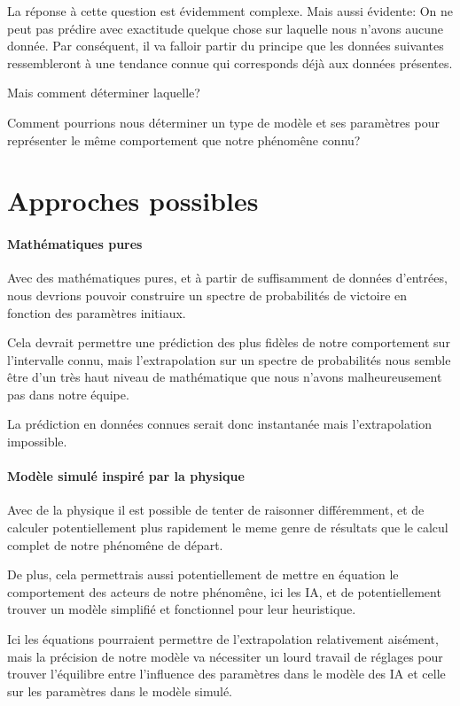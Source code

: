 		La réponse à cette question est évidemment complexe. Mais aussi évidente: On ne peut pas prédire avec exactitude quelque chose sur laquelle nous n'avons aucune donnée. 
		Par conséquent, il va falloir partir du principe que les données suivantes ressembleront à une tendance connue qui corresponds déjà aux données présentes.
		
		Mais comment déterminer laquelle?
	
		\begin{problem}
			Comment pourrions nous déterminer un type de modèle et ses paramètres pour représenter le même comportement que notre phénomêne connu?
		\end{problem}
	
	\section{Approches possibles}
	
		\paragraph{Mathématiques pures}
		Avec des mathématiques pures, et à partir de suffisamment de données d'entrées, nous devrions pouvoir construire un spectre de probabilités de victoire en fonction des paramètres initiaux.
		
		Cela devrait permettre une prédiction des plus fidèles de notre comportement sur l'intervalle connu, mais l'extrapolation sur un spectre de probabilités nous semble être d'un très haut niveau de mathématique que nous n'avons malheureusement pas dans notre équipe.
		
		La prédiction en données connues serait donc instantanée mais l'extrapolation impossible.
		
		\paragraph{Modèle simulé inspiré par la physique}
		Avec de la physique il est possible de tenter de raisonner différemment, et de calculer potentiellement plus rapidement le meme genre de résultats que le calcul complet de notre phénomêne de départ.
		
		De plus, cela permettrais aussi potentiellement de mettre en équation le comportement des acteurs de notre phénomêne, ici les IA, et de potentiellement trouver un modèle simplifié et fonctionnel pour leur heuristique.
		
		Ici les équations pourraient permettre de l'extrapolation relativement aisément, mais la précision de notre modèle va nécessiter un lourd travail de réglages pour trouver l'équilibre entre l'influence des paramètres dans le modèle des IA et celle sur les paramètres dans le modèle simulé. 
		
